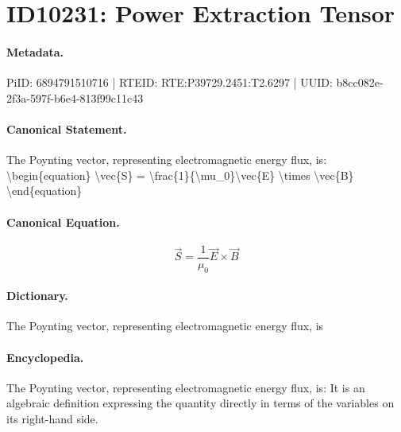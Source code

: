 \section*{ID10231: Power Extraction Tensor}
\paragraph{Metadata.}
PiID: 6894791510716 | RTEID: RTE:P39729.2451:T2.6297 | UUID: b8cc082e-2f3a-597f-b6e4-813f99c11c43

\paragraph{Canonical Statement.}
The Poynting vector, representing electromagnetic energy flux, is: \textbackslash{}begin\{equation\} \textbackslash{}vec\{S\} = \textbackslash{}frac\{1\}\{\textbackslash{}mu\_0\}\textbackslash{}vec\{E\} \textbackslash{}times \textbackslash{}vec\{B\} \textbackslash{}end\{equation\}

\paragraph{Canonical Equation.}
\[
\vec{S} = \frac{1}{\mu_0}\vec{E} \times \vec{B}
\]

\paragraph{Dictionary.}
The Poynting vector, representing electromagnetic energy flux, is

\paragraph{Encyclopedia.}
The Poynting vector, representing electromagnetic energy flux, is: It is an algebraic definition expressing the quantity directly in terms of the variables on its right-hand side.
